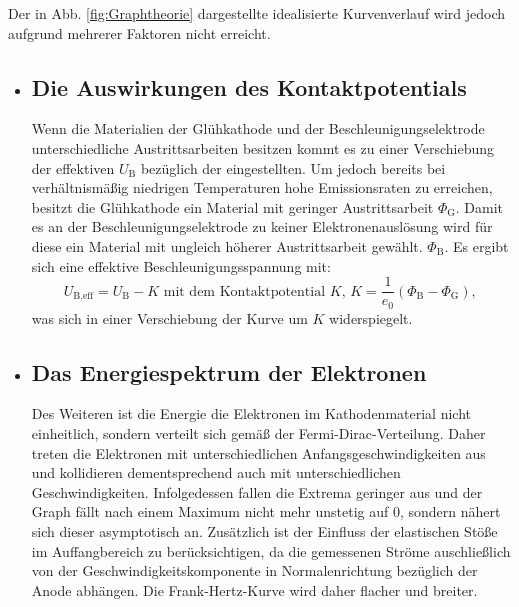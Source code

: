 Der in Abb. \ref{fig:Graphtheorie} dargestellte idealisierte Kurvenverlauf wird jedoch
aufgrund mehrerer Faktoren nicht erreicht.


\begin{itemize}
  \item \subsection{Die Auswirkungen des Kontaktpotentials}
  Wenn die Materialien der Glühkathode und der Beschleunigungselektrode unterschiedliche
  Austrittsarbeiten besitzen kommt es zu einer Verschiebung der effektiven $U_\text{B}$ bezüglich der
  eingestellten. Um jedoch bereits bei verhältnismäßig niedrigen Temperaturen hohe Emissionsraten
  zu erreichen, besitzt die Glühkathode ein Material mit geringer Austrittsarbeit $\Phi_\text{G}$.
  Damit es an der Beschleunigungselektrode zu keiner Elektronenauslösung wird
  für diese ein Material mit ungleich höherer Austrittsarbeit gewählt.
  $\Phi_\text{B}$. Es ergibt sich eine effektive Beschleunigungsspannung mit:
  \begin{equation}
    U_\text{B,eff} = U_\text{B} - K \text{ mit dem Kontaktpotential }K\text{, } K = \frac{1}{e_0}\left(\Phi_\text{B} - \Phi _\text{G} \right)\text{, }\label{eq:kontakt}
  \end{equation}
was sich in einer Verschiebung der Kurve um $K$ widerspiegelt.

\item \subsection{Das Energiespektrum der Elektronen}
Des Weiteren ist die Energie die Elektronen im Kathodenmaterial nicht einheitlich, sondern
verteilt sich gemäß der Fermi-Dirac-Verteilung. Daher treten die Elektronen mit
unterschiedlichen Anfangsgeschwindigkeiten aus und kollidieren dementsprechend
auch mit unterschiedlichen Geschwindigkeiten. %
Infolgedessen fallen die Extrema geringer aus und der Graph fällt nach einem
Maximum nicht mehr unstetig auf 0, sondern nähert sich dieser asymptotisch an. Zusätzlich
ist der Einfluss der elastischen Stöße im Auffangbereich zu berücksichtigen, da die gemessenen
Ströme auschließlich von der Geschwindigkeitskomponente in Normalenrichtung bezüglich
der Anode abhängen. %
Die Frank-Hertz-Kurve wird daher flacher und breiter.



\end{itemize}
